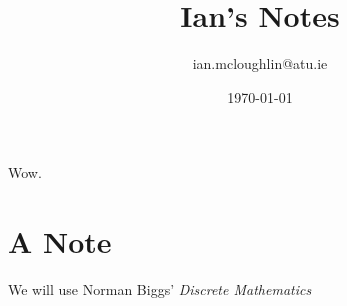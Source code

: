 \documentclass{iansnotes}
\title{Ian's Notes}
\author{ian.mcloughlin@atu.ie}
\date{\today}
\begin{document}
\maketitle

Wow.

\section{A Note}
  We will use Norman Biggs' \emph{Discrete Mathematics}\autocite{biggs}
\end{document}
